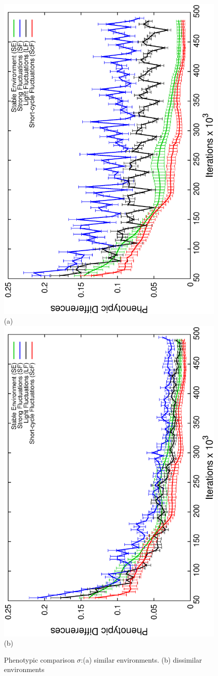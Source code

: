 \begin{figure}[h]
\centering
\includegraphics[width=0.7\columnwidth, angle=-90]{img/diffProp}
(a)
\includegraphics[width=0.7\columnwidth, angle=-90]{img/ProgressProp}
(b)
\caption{Phenotypic comparison $\sigma$:(a) similar environments. (b) dissimilar environments}
\label{fig:similar}
\end{figure}

